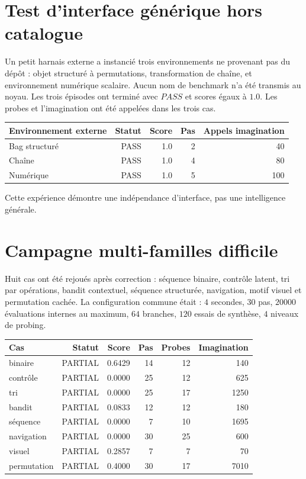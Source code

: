 \documentclass[11pt,a4paper]{article}
\begin{document}
\section{Test d'interface générique hors catalogue}
Un petit harnais externe a instancié trois environnements ne provenant pas du dépôt : objet structuré à permutations, transformation de chaîne, et environnement numérique scalaire. Aucun nom de benchmark n'a été transmis au noyau. Les trois épisodes ont terminé avec $PASS$ et scores égaux à $1.0$. Les probes et l'imagination ont été appelées dans les trois cas.

\begin{center}
\begin{tabular}{lrrrr}
\toprule
Environnement externe & Statut & Score & Pas & Appels imagination\\
\midrule
Bag structuré & PASS & 1.0 & 2 & 40\\
Chaîne & PASS & 1.0 & 4 & 80\\
Numérique & PASS & 1.0 & 5 & 100\\
\bottomrule
\end{tabular}
\end{center}

Cette expérience démontre une indépendance d'interface, pas une intelligence générale.

\section{Campagne multi-familles difficile}
Huit cas ont été rejoués après correction : séquence binaire, contrôle latent, tri par opérations, bandit contextuel, séquence structurée, navigation, motif visuel et permutation cachée. La configuration commune était : $4$ secondes, $30$ pas, $20000$ évaluations internes au maximum, $64$ branches, $120$ essais de synthèse, $4$ niveaux de probing.

\begin{center}
\scriptsize
\begin{tabular}{lrrrrr}
\toprule
Cas & Statut & Score & Pas & Probes & Imagination\\
\midrule
binaire & PARTIAL & 0.6429 & 14 & 12 & 140\\
contrôle & PARTIAL & 0.0000 & 25 & 12 & 625\\
tri & PARTIAL & 0.0000 & 25 & 17 & 1250\\
bandit & PARTIAL & 0.0833 & 12 & 12 & 180\\
séquence & PARTIAL & 0.0000 & 7 & 10 & 1695\\
navigation & PARTIAL & 0.0000 & 30 & 25 & 600\\
visuel & PARTIAL & 0.2857 & 7 & 7 & 70\\
permutation & PARTIAL & 0.4000 & 30 & 17 & 7010\\
\bottomrule
\end{tabular}
\end{center}
\end{document}
